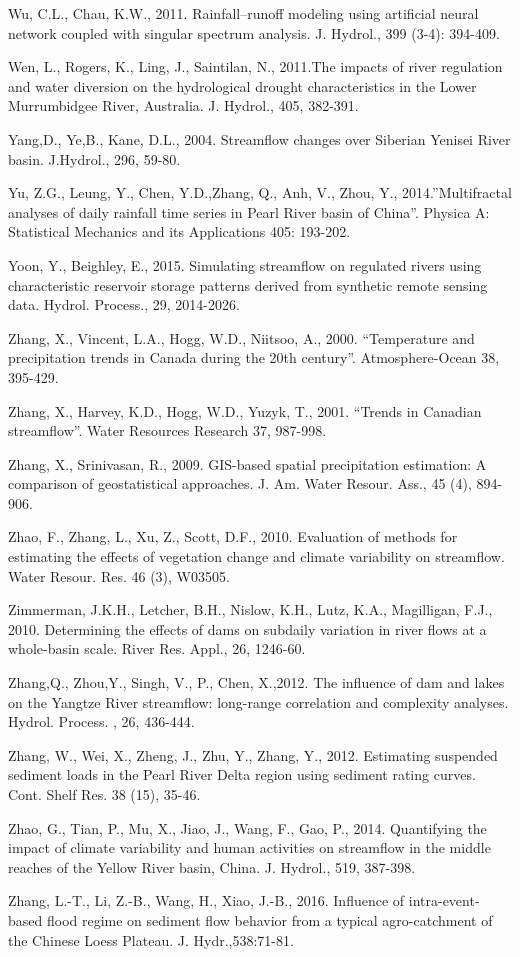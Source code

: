 \begin{hangingpar}{2em}
Wu, C.L., Chau, K.W., 2011. Rainfall–runoff modeling using artificial neural network coupled with singular spectrum analysis. J. Hydrol., 399 (3-4): 394-409.

Wen, L., Rogers, K., Ling, J., Saintilan, N., 2011.The impacts of river regulation and water diversion on the hydrological drought characteristics in the Lower Murrumbidgee River, Australia. J. Hydrol., 405, 382-391.

Yang,D., Ye,B., Kane, D.L., 2004. Streamflow changes over Siberian Yenisei River basin. J.Hydrol., 296, 59-80.

Yu, Z.G., Leung, Y.,  Chen, Y.D.,Zhang, Q., Anh, V., Zhou, Y., 2014.''Multifractal analyses of daily rainfall time series in Pearl River basin of China''. Physica A: Statistical Mechanics and its Applications 405: 193-202.

Yoon, Y., Beighley, E., 2015. Simulating streamflow on regulated rivers using characteristic reservoir storage patterns derived from synthetic remote sensing data. Hydrol. Process., 29, 2014-2026.

Zhang, X., Vincent, L.A., Hogg, W.D., Niitsoo, A., 2000. ``Temperature and precipitation trends in Canada during the 20th century''. Atmosphere-Ocean 38, 395-429.

Zhang, X., Harvey, K.D., Hogg, W.D., Yuzyk, T., 2001. ``Trends in Canadian streamflow''. Water Resources Research 37, 987-998.

Zhang, X., Srinivasan, R., 2009. GIS-based spatial precipitation estimation: A comparison of geostatistical approaches. J. Am. Water Resour. Ass., 45 (4), 894-906.

Zhao, F., Zhang, L., Xu, Z., Scott, D.F., 2010. Evaluation of methods for estimating the effects of vegetation change and climate variability on streamflow. Water Resour. Res. 46 (3), W03505.

Zimmerman, J.K.H., Letcher, B.H., Nislow, K.H., Lutz, K.A., Magilligan, F.J., 2010. Determining the effects of dams on subdaily variation in river flows at a whole-basin scale. River Res. Appl., 26, 1246-60. 

Zhang,Q.,  Zhou,Y., Singh, V., P., Chen, X.,2012. The inﬂuence of dam and lakes on the Yangtze River streamﬂow: long-range correlation and complexity analyses. Hydrol. Process. , 26, 436-444.

Zhang, W., Wei, X., Zheng, J., Zhu, Y., Zhang, Y., 2012. Estimating suspended sediment loads in the Pearl River Delta region using sediment rating curves. Cont. Shelf Res. 38 (15), 35-46.

Zhao, G., Tian, P., Mu, X., Jiao, J., Wang, F., Gao, P., 2014. Quantifying the impact of climate variability and human activities on streamflow in the middle reaches of the Yellow River basin, China. J. Hydrol., 519, 387-398.

Zhang, L.-T., Li, Z.-B., Wang, H., Xiao, J.-B., 2016. Influence of intra-event-based flood regime on sediment flow behavior from a typical agro-catchment of the Chinese Loess Plateau. J. Hydr.,538:71-81.

\end{hangingpar}

